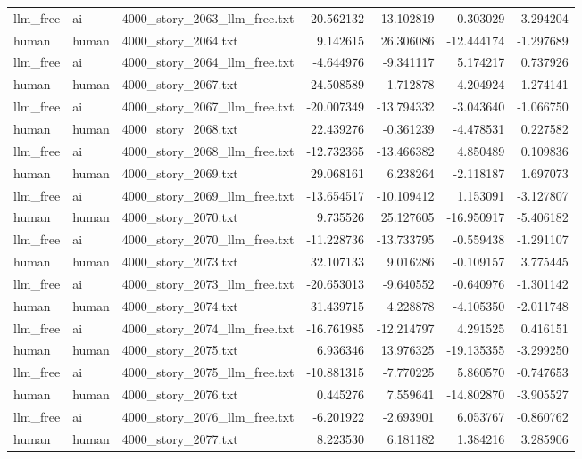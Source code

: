 \begin{longtable}{lllrrrr}
llm\_free & ai & 4000\_story\_2063\_llm\_free.txt & -20.562132 & -13.102819 & 0.303029 & -3.294204 \\
human & human & 4000\_story\_2064.txt & 9.142615 & 26.306086 & -12.444174 & -1.297689 \\
llm\_free & ai & 4000\_story\_2064\_llm\_free.txt & -4.644976 & -9.341117 & 5.174217 & 0.737926 \\
human & human & 4000\_story\_2067.txt & 24.508589 & -1.712878 & 4.204924 & -1.274141 \\
llm\_free & ai & 4000\_story\_2067\_llm\_free.txt & -20.007349 & -13.794332 & -3.043640 & -1.066750 \\
human & human & 4000\_story\_2068.txt & 22.439276 & -0.361239 & -4.478531 & 0.227582 \\
llm\_free & ai & 4000\_story\_2068\_llm\_free.txt & -12.732365 & -13.466382 & 4.850489 & 0.109836 \\
human & human & 4000\_story\_2069.txt & 29.068161 & 6.238264 & -2.118187 & 1.697073 \\
llm\_free & ai & 4000\_story\_2069\_llm\_free.txt & -13.654517 & -10.109412 & 1.153091 & -3.127807 \\
human & human & 4000\_story\_2070.txt & 9.735526 & 25.127605 & -16.950917 & -5.406182 \\
llm\_free & ai & 4000\_story\_2070\_llm\_free.txt & -11.228736 & -13.733795 & -0.559438 & -1.291107 \\
human & human & 4000\_story\_2073.txt & 32.107133 & 9.016286 & -0.109157 & 3.775445 \\
llm\_free & ai & 4000\_story\_2073\_llm\_free.txt & -20.653013 & -9.640552 & -0.640976 & -1.301142 \\
human & human & 4000\_story\_2074.txt & 31.439715 & 4.228878 & -4.105350 & -2.011748 \\
llm\_free & ai & 4000\_story\_2074\_llm\_free.txt & -16.761985 & -12.214797 & 4.291525 & 0.416151 \\
human & human & 4000\_story\_2075.txt & 6.936346 & 13.976325 & -19.135355 & -3.299250 \\
llm\_free & ai & 4000\_story\_2075\_llm\_free.txt & -10.881315 & -7.770225 & 5.860570 & -0.747653 \\
human & human & 4000\_story\_2076.txt & 0.445276 & 7.559641 & -14.802870 & -3.905527 \\
llm\_free & ai & 4000\_story\_2076\_llm\_free.txt & -6.201922 & -2.693901 & 6.053767 & -0.860762 \\
human & human & 4000\_story\_2077.txt & 8.223530 & 6.181182 & 1.384216 & 3.285906 \\

\end{longtable}
